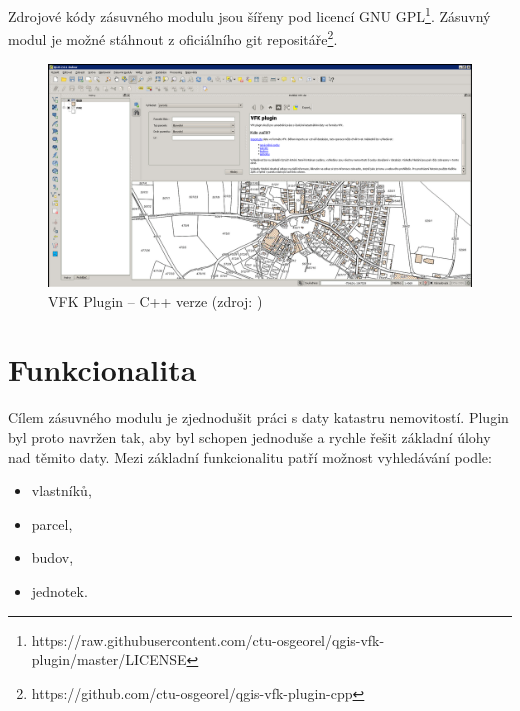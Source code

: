 \documentclass[a4paper,12pt,oneside]{book}
\begin{document}
Zdrojové kódy zásuvného modulu jsou šířeny pod licencí GNU GPL\footnote{https://raw.githubusercontent.com/ctu-osgeorel/qgis-vfk-plugin/master/LICENSE}. Zásuvný modul je možné stáhnout z oficiálního git repositáře\footnote{https://github.com/ctu-osgeorel/qgis-vfk-plugin-cpp}. \cite{cvut_vfkPlugin}

\begin{figure}[htb]
\centering
\includegraphics[width=\textwidth]{images/vfkPlugin-puvodni_okno.png}
\caption[VFK Plugin -- C++ verze]{VFK Plugin -- C++ verze (zdroj: \cite{cvut_vfkPlugin})}
\end{figure}

\newpage
\section{Funkcionalita}
Cílem zásuvného modulu je zjednodušit práci s daty katastru nemovitostí. Plugin byl proto navržen tak, aby byl schopen jednoduše a rychle řešit základní úlohy nad těmito daty. Mezi základní funkcionalitu patří možnost vyhledávání podle:

\begin{itemize}
 \item vlastníků,
 \item parcel,
 \item budov,
 \item jednotek.
\end{itemize}
\end{document}
